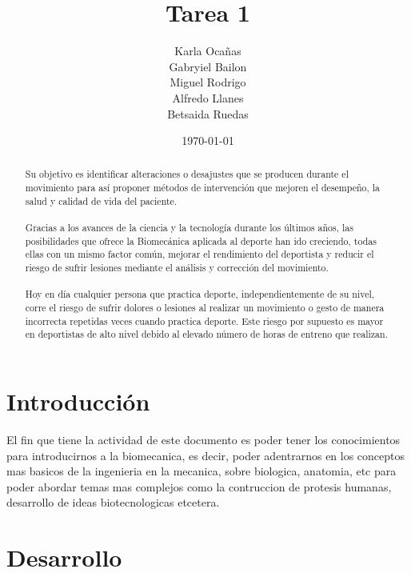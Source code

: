 \documentclass{article}
\author{Karla Ocañas \\ Gabryiel Bailon \\ Miguel Rodrigo \\ Alfredo Llanes \\ Betsaida Ruedas} %
\title{Tarea 1} %
\date{\today}
\begin{document}

\maketitle %

\begin{abstract} %
Su objetivo es identificar alteraciones o desajustes que se producen durante el movimiento para así proponer métodos de intervención que mejoren el desempeño, la salud y calidad de vida del paciente.\\
\\
Gracias a los avances de la ciencia y la tecnología durante los últimos años, las posibilidades que ofrece la Biomecánica aplicada al deporte han ido creciendo, todas ellas con un mismo factor común, mejorar el rendimiento del deportista y reducir el riesgo de sufrir lesiones mediante el análisis y corrección del movimiento.
\\
\\
Hoy en día cualquier persona que practica deporte, independientemente de su nivel, corre el riesgo de sufrir dolores o lesiones al realizar un movimiento o gesto de manera incorrecta repetidas veces cuando practica deporte. Este riesgo por supuesto es mayor en deportistas de alto nivel debido al elevado número de horas de entreno que realizan.\\

\end{abstract}


\section{Introducci\'{o}n}\label{intro} %
El fin que tiene la actividad de este documento es poder tener los conocimientos para introducirnos a la biomecanica, es decir, poder adentrarnos en los conceptos mas basicos de la ingenieria en la mecanica, sobre biologica, anatomia, etc para poder abordar temas mas complejos como la contruccion de protesis humanas, desarrollo de ideas biotecnologicas etcetera.  


\section{Desarrollo}
\end{document}

